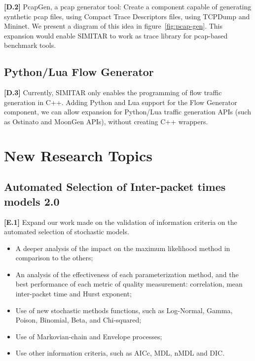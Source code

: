 \textbf{[D.2]} PcapGen, a pcap generator tool: Create a component capable of generating synthetic pcap files, using Compact Trace Descriptors files, using TCPDump\cite{web-tcpdump} and Mininet\cite{web-mininet}.  We present a diagram of this idea in figure~\ref{fig:pcap-gen}. This expansion would enable SIMITAR to work as trace library for pcap-based benchmark tools.

\subsection{Python/Lua Flow Generator}

\textbf{[D.3]} Currently, SIMITAR only enables the programming of flow traffic generation in C++. Adding Python and Lua support for the Flow Generator component, we can allow expansion for Python/Lua traffic generation APIs (such as Ostinato and MoonGen APIs), without creating C++ wrappers. 


\section{New Research Topics}


\subsection{Automated Selection of Inter-packet times models 2.0}

\textbf{[E.1]} Expand our work made on the validation of information criteria on the automated selection of stochastic models. 
\begin{itemize}
\item A deeper analysis of the impact on the maximum likelihood method in comparison to the others;
\item An analysis of the effectiveness of each parameterization method, and the best performance of each metric of quality measurement: correlation,  mean inter-packet time and Hurst exponent; 
\item Use of new stochastic methods functions, such as Log-Normal, Gamma, Poison, Binomial, Beta, and Chi-squared;
\item Use of Markovian-chain and Envelope processes;
\item Use other information criteria, such as AICc, MDL, nMDL\cite{information-criteria} and DIC\cite{dic-paper}.
\end{itemize}

